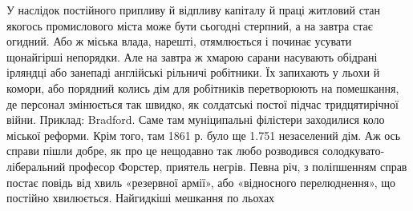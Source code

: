 У наслідок постійного припливу й відпливу капіталу й праці
житловий стан якогось промислового міста може бути сьогодні
стерпний, а на завтра стає огидний. Або ж міська влада, нарешті,
отямлюється і починає усувати щонайгірші непорядки. Але на
завтра ж хмарою сарани насувають обідрані ірляндці або занепаді
англійські рільничі робітники. Їх запихають у льохи й
комори, або порядний колись дім для робітників перетворюють
на помешкання, де персонал змінюється так швидко, як солдатські
постої підчас тридцятирічної війни. Приклад: Bradford.
Саме там муніципальні філістери заходилися коло міської реформи.
Крім того, там 1861 р. було ще \num{1.751} незаселений дім.
Аж ось справи пішли добре, як про це нещодавно так любо
розводився солодкувато-ліберальний професор Форстер, приятель
негрів. Певна річ, з поліпшенням справ постає повідь
від хвиль «резервної армії», або «відносного перелюднення»,
що постійно хвилюється. Найгидкіші мешкання по льохах

